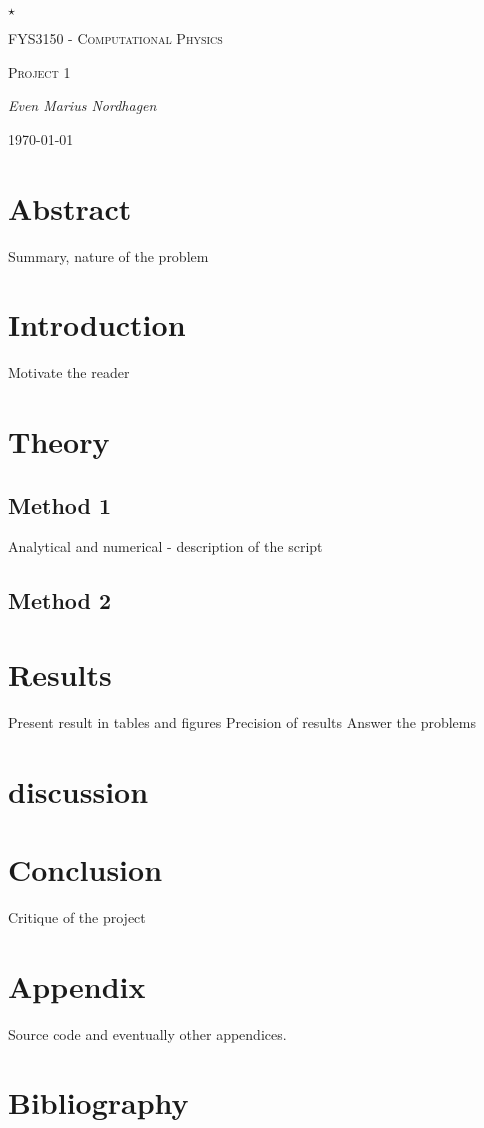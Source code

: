 \documentclass{scrartcl}
\begin{document}
\begin{titlepage}
	\centering
	{\scshape\LARGE $\star$  \par}
	\vspace{4cm}
	{\scshape\huge FYS3150 - Computational Physics  \par}
	\vspace{1cm}
	{\scshape\Large Project 1\par}
	\vspace{2cm}
	{\Large\itshape Even Marius Nordhagen\par}
	\vfill
	{\large \today\par}
\end{titlepage}

\tableofcontents
\newpage

\section{Abstract}
Summary, nature of the problem

\section{Introduction}
Motivate the reader

\section{Theory}
\subsection{Method 1}
Analytical and numerical - description of the script
\subsection{Method 2}

\section{Results}
Present result in tables and figures
Precision of results
Answer the problems
\section{discussion}

\section{Conclusion}
Critique of the project

\section{Appendix}
Source code and eventually other appendices.

\section{Bibliography}
\end{document}
